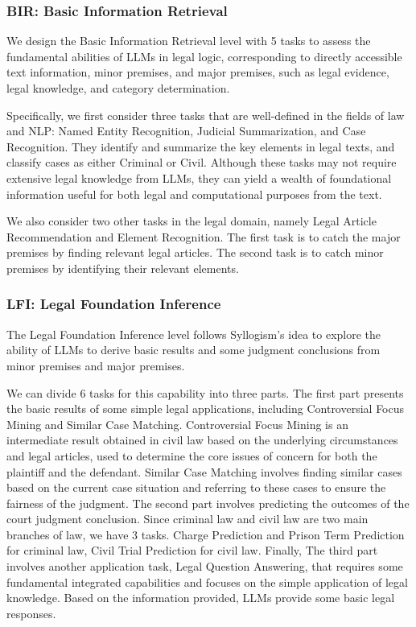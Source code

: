 \subsubsection{BIR: Basic Information Retrieval}
We design the Basic Information Retrieval level with 5 tasks to assess the fundamental abilities of LLMs in legal logic, corresponding to directly accessible text information, minor premises, and major premises, such as legal evidence, legal knowledge, and category determination.

Specifically, we first consider three tasks that are well-defined in the fields of law and NLP: Named Entity Recognition, Judicial Summarization, and Case Recognition. 
They identify and summarize the key elements in legal texts, and classify cases as either Criminal or Civil.
Although these tasks may not require extensive legal knowledge from LLMs, they can yield a wealth of foundational information useful for both legal and computational purposes from the text.

We also consider two other tasks in the legal domain, namely Legal Article Recommendation and Element Recognition. 
The first task is to catch the major premises by finding relevant legal articles. The second task is to catch minor premises by identifying their relevant elements.

\subsubsection{LFI: Legal Foundation Inference} 
The Legal Foundation Inference level follows Syllogism's idea to explore the ability of LLMs to derive basic results and some judgment conclusions from minor premises and major premises.

We can divide 6 tasks for this capability into three parts. 
The first part presents the basic results of some simple legal applications, including Controversial Focus Mining and Similar Case Matching. 
Controversial Focus Mining is an intermediate result obtained in civil law based on the underlying circumstances and legal articles, used to determine the core issues of concern for both the plaintiff and the defendant.
Similar Case Matching involves finding similar cases based on the current case situation and referring to these cases to ensure the fairness of the judgment.
The second part involves predicting the outcomes of the court judgment conclusion. Since criminal law and civil law are two main branches of law, we have 3 tasks. Charge Prediction and Prison Term Prediction for criminal law, Civil Trial Prediction for civil law. 
Finally, The third part involves another application task, Legal Question Answering, that requires some fundamental integrated capabilities and focuses on the simple application of legal knowledge. 
Based on the information provided, LLMs provide some basic legal responses.

